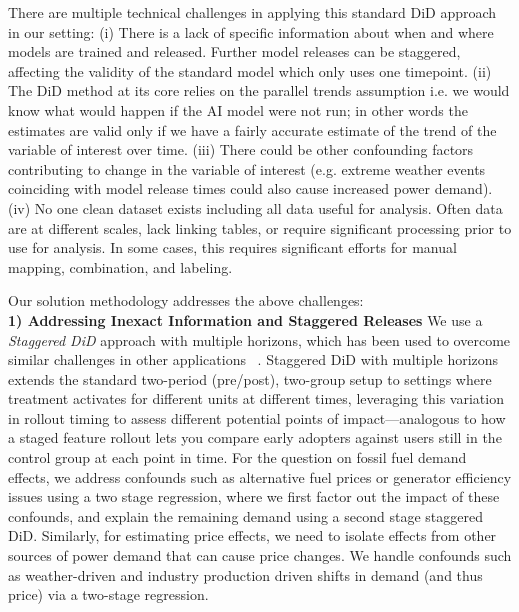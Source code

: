\documentclass[a4paper,fleqn,longmktitle]{cas-sc}
\newcommand{\nb}[1]{\textcolor{blue}{NB[#1]}}
\newcommand{\aruna}[1]{\textcolor{blue}{Aruna[#1]}}
\theoremstyle{plain}
\theoremstyle{definition}
\begin{document}
There are multiple technical challenges in applying this standard DiD approach in our setting: (i) There is a lack of specific information about when and where models are trained and released. Further model releases can be staggered, affecting the validity of the standard model which only uses one timepoint. (ii) The DiD method at its core relies on the parallel trends assumption i.e. we would know what would happen if the AI model were not run; in other words the estimates are valid only if we have a fairly accurate estimate of the trend of the variable of interest over time. (iii) There could be other confounding factors contributing to change in the variable of interest (e.g. extreme weather events coinciding with model release times could also cause increased power demand). (iv) No one clean dataset exists including all data useful for analysis. Often data are at different scales, lack linking tables, or require significant processing prior to use for analysis. In some cases, this requires significant efforts for manual mapping, combination, and labeling.

Our solution methodology addresses the above challenges:\\
\noindent \textbf{1) Addressing Inexact Information and Staggered Releases} %
We use a \textit{Staggered DiD} approach with multiple horizons, which has been used to overcome similar challenges in other applications ~\cite{cengiz2019effect, deshpande2019screened}. Staggered DiD with multiple horizons extends the standard two-period (pre/post), two-group setup to settings where treatment activates for different units at different times, leveraging this variation in rollout timing to assess different potential points of impact—analogous to how a staged feature rollout lets you compare early adopters against users still in the control group at each point in time.
For the question on fossil fuel demand effects, we address confounds such as alternative fuel prices or generator efficiency issues using a two stage regression, where we first factor out the impact of these confounds, and explain the remaining demand using a second stage staggered DiD. Similarly, for estimating price effects, we need to isolate effects from other sources of power demand that can cause price changes.
We handle confounds such as weather-driven and industry production driven shifts in demand (and thus price) via a two-stage regression. 
\end{document}
